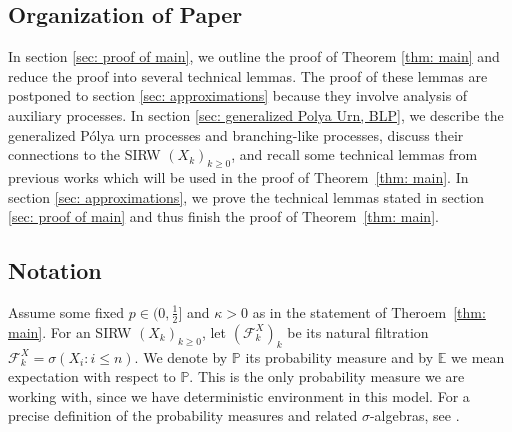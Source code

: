 \documentclass[twoside,12pt, a4paper]{article}
\numberwithin{equation}{section}
\theoremstyle{remark}
\newcommand\TBD{\textcolor{red}{TBD.}}
\begin{document}
	

	\subsection{Organization of Paper}
	In section \ref{sec: proof of main}, we outline the proof of Theorem \ref{thm: main} and reduce the proof into several technical lemmas. The proof of these lemmas are postponed to section \ref{sec: approximations} because they involve analysis of auxiliary processes. In section \ref{sec: generalized Polya Urn, BLP}, we describe the generalized P\'{o}lya urn processes and branching-like processes, discuss their connections to the SIRW $(X_k)_{k\geq 0}$, and recall some technical lemmas from previous works which will be used in the proof of Theorem~\ref{thm: main}. In section \ref{sec: approximations}, we prove the technical lemmas stated in section \ref{sec: proof of main} and thus finish the proof of Theorem~\ref{thm: main}. 
	
	\subsection{Notation}

	Assume some fixed $p \in (0,\frac{1}{2}]$ and $\kappa > 0$ as in the statement of Theroem~\ref{thm: main}. For an SIRW $(X_k)_{k\geq 0}$, let $(\mathcal{F}^X_k)_k$ be its natural filtration $\mathcal{F}^X_k = \sigma\left(X_i: i\leq n \right).$ 
	We denote by $\mathbb{P}$ its probability measure and by $\mathbb{E}$ we mean expectation with respect to $\mathbb{P}$. This is the only probability measure we are working with, since we have deterministic environment in this model. For a precise definition of the probability measures and related $\sigma$-algebras, see \cite{KMP23}.
\end{document}
